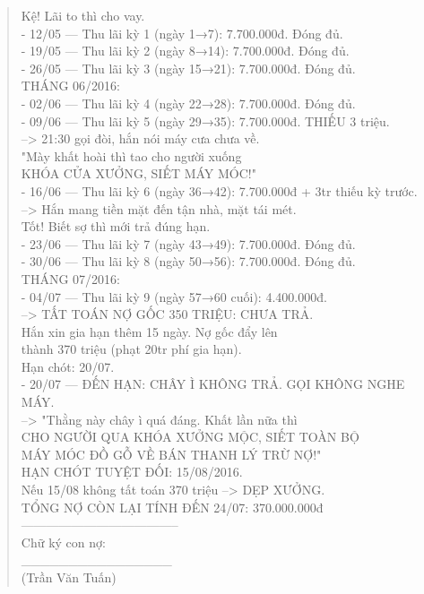 \documentclass[12pt,a4paper]{article}
\begin{document}
\begin{quote}
            Kệ! Lãi to thì cho vay.\\
\vspace{0.2cm}
- 12/05 --- Thu lãi kỳ 1 (ngày 1→7): 7.700.000đ. Đóng đủ.\\
- 19/05 --- Thu lãi kỳ 2 (ngày 8→14): 7.700.000đ. Đóng đủ.\\
- 26/05 --- Thu lãi kỳ 3 (ngày 15→21): 7.700.000đ. Đóng đủ.\\
\vspace{0.2cm}
THÁNG 06/2016:\\
- 02/06 --- Thu lãi kỳ 4 (ngày 22→28): 7.700.000đ. Đóng đủ.\\
- 09/06 --- Thu lãi kỳ 5 (ngày 29→35): 7.700.000đ. THIẾU 3 triệu.\\
          --> 21:30 gọi đòi, hắn nói máy cưa chưa về.\\
              "Mày khất hoài thì tao cho người xuống\\
               KHÓA CỬA XƯỞNG, SIẾT MÁY MÓC!"\\
- 16/06 --- Thu lãi kỳ 6 (ngày 36→42): 7.700.000đ + 3tr thiếu kỳ trước.\\
          --> Hắn mang tiền mặt đến tận nhà, mặt tái mét.\\
              Tốt! Biết sợ thì mới trả đúng hạn.\\
- 23/06 --- Thu lãi kỳ 7 (ngày 43→49): 7.700.000đ. Đóng đủ.\\
- 30/06 --- Thu lãi kỳ 8 (ngày 50→56): 7.700.000đ. Đóng đủ.\\
\vspace{0.2cm}
THÁNG 07/2016:\\
- 04/07 --- Thu lãi kỳ 9 (ngày 57→60 cuối): 4.400.000đ.\\
          --> TẤT TOÁN NỢ GỐC 350 TRIỆU: CHƯA TRẢ.\\
              Hắn xin gia hạn thêm 15 ngày. Nợ gốc đẩy lên\\
              thành 370 triệu (phạt 20tr phí gia hạn).\\
              Hạn chót: 20/07.\\
- 20/07 --- ĐẾN HẠN: CHÂY Ì KHÔNG TRẢ. GỌI KHÔNG NGHE MÁY.\\
          --> "Thằng này chây ì quá đáng. Khất lần nữa thì\\
               CHO NGƯỜI QUA KHÓA XƯỞNG MỘC, SIẾT TOÀN BỘ\\
               MÁY MÓC ĐỒ GỖ VỀ BÁN THANH LÝ TRỪ NỢ!"\\
          HẠN CHÓT TUYỆT ĐỐI: 15/08/2016.\\
          Nếu 15/08 không tất toán 370 triệu --> DẸP XƯỞNG.\\
\vspace{0.2cm}
TỔNG NỢ CÒN LẠI TÍNH ĐẾN 24/07: 370.000.000đ \\
--------------------------------------\\
Chữ ký con nợ:\\
\vspace{0.2cm}
\_\_\_\_\_\_\_\_\_\_\_\_\_\_\_\_\\
(Trần Văn Tuấn)\\
\end{quote}
\end{document}
